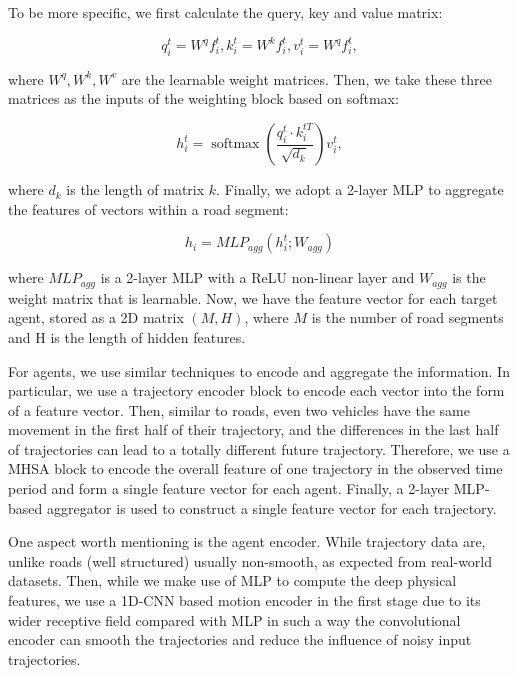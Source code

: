 To be more specific, we first calculate the query, key and value matrix:

\begin{equation}
	q_i^t=W^q f_i^t, k_i^t=W^k f_i^t, v_i^t=W^q f_i^t,
\end{equation}

where $W^q, W^k, W^v$ are the learnable weight matrices. Then, we take these three matrices as the inputs of the weighting block based on softmax:

\begin{equation}
	h_i^t=\operatorname{softmax}\left(\frac{q_i^t \cdot k_i^{t T}}{\sqrt{d_k}}\right) v_i^t,
\end{equation}

where $d_k$ is the length of matrix $k$. Finally, we adopt a 2-layer MLP to aggregate the features of vectors within a road segment:

\begin{equation}
	h_i=MLP_{a g g}\left(h_i^t ; W_{a g g}\right)
\end{equation}

where $MLP_{a g g}$ is a 2-layer MLP with a ReLU non-linear layer and $W_{a g g}$ is the weight matrix that is learnable. Now, we have the feature vector for each target agent, stored as a 2D matrix $(M, H)$, where $M$ is the number of road segments and $\mathrm{H}$ is the length of hidden features. 

For agents, we use similar techniques to encode and aggregate the information. In particular, we use a trajectory encoder block to encode each vector into the form of a feature vector. Then, similar to roads, even two vehicles have the same movement in the first half of their trajectory, and the differences in the last half of trajectories can lead to a totally different future trajectory. Therefore, we use a MHSA block to encode the overall feature of one trajectory in the observed time period and form a single feature vector for each agent. Finally, a 2-layer MLP-based aggregator is used to construct a single feature vector for each trajectory.

One aspect worth mentioning is the agent encoder. While trajectory data are, unlike roads (well structured) usually non-smooth, as expected from real-world datasets. Then, while we make use of MLP to compute the deep physical features, we use a 1D-CNN based motion encoder in the first stage due to its wider receptive field compared with MLP in such a way the convolutional encoder can smooth the trajectories and reduce the influence of noisy input trajectories.

